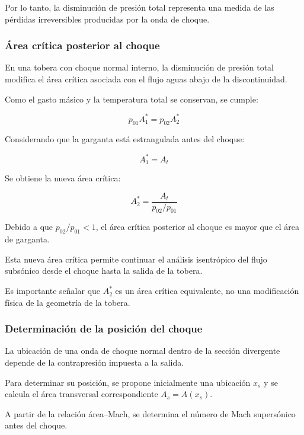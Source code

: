 \documentclass[12pt,letterpaper]{article}
\numberwithin{equation}{section}
\begin{document}
Por lo tanto, la disminución de presión
total representa una medida de las
pérdidas irreversibles producidas
por la onda de choque.


\subsubsection{Área crítica posterior al choque}

En una tobera con choque normal interno,
la disminución de presión total modifica
el área crítica asociada con el flujo
aguas abajo de la discontinuidad.

Como el gasto másico y la temperatura
total se conservan, se cumple:

\begin{equation}
    p_{01}A_1^*
    =p_{02}A_2^*
\end{equation}

Considerando que la garganta está
estrangulada antes del choque:

\begin{equation}
    A_1^*=A_t
\end{equation}

Se obtiene la nueva área crítica:

\begin{equation}
    \boxed{
    A_2^*=
    \frac{A_t}{p_{02}/p_{01}}
    }
    \label{eq:area_critica_postchoque}
\end{equation}

Debido a que $p_{02}/p_{01}<1$,
el área crítica posterior al choque
es mayor que el área de garganta.

Esta nueva área crítica permite
continuar el análisis isentrópico
del flujo subsónico desde el choque
hasta la salida de la tobera.

Es importante señalar que $A_2^*$
es un área crítica equivalente,
no una modificación física de la
geometría de la tobera.


\subsubsection{Determinación de la posición del choque}

La ubicación de una onda de choque normal
dentro de la sección divergente depende
de la contrapresión impuesta a la salida.

Para determinar su posición, se propone
inicialmente una ubicación $x_s$ y
se calcula el área transversal
correspondiente $A_s=A(x_s)$.

A partir de la relación área--Mach,
se determina el número de Mach
supersónico antes del choque.
\end{document}
